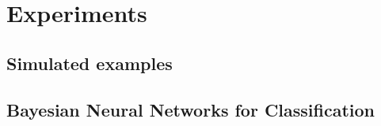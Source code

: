 
\section{Experiments}

\subsection{Simulated examples}

\subsection{Bayesian Neural Networks for Classification}